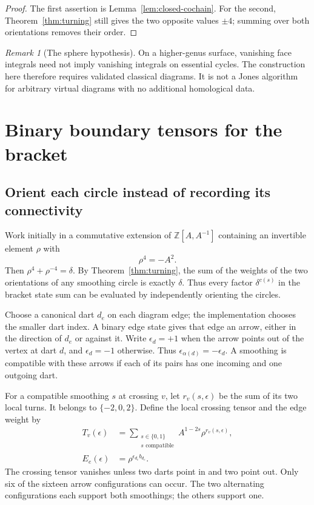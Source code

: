 \documentclass[11pt]{article}
\theoremstyle{definition}
\theoremstyle{remark}
\newtheorem{remark}[theorem]{Remark}
\newcommand{\Z}{\mathbb Z}
\begin{document}
\begin{proof}
The first assertion is Lemma~\ref{lem:closed-cochain}. For the second,
Theorem~\ref{thm:turning} still gives the two opposite values $\pm4$;
summing over both orientations removes their order.
\end{proof}

\begin{remark}[The sphere hypothesis]
On a higher-genus surface, vanishing face integrals need not imply
vanishing integrals on essential cycles. The construction here therefore
requires validated classical diagrams. It is not a Jones algorithm for
arbitrary virtual diagrams with no additional homological data.
\end{remark}

\section{Binary boundary tensors for the bracket}
\label{sec:tensors}

\subsection{Orient each circle instead of recording its connectivity}

Work initially in a commutative extension of
$\Z[A,A^{-1}]$ containing an invertible element $\rho$ with
\begin{equation}\label{eq:rho-fourth}
 \rho^4=-A^2.
\end{equation}
Then $\rho^4+\rho^{-4}=\delta$. By Theorem~\ref{thm:turning}, the sum of the
weights of the two orientations of any smoothing circle is exactly
$\delta$. Thus every factor $\delta^{c(s)}$ in the bracket state sum can
be evaluated by independently orienting the circles.

Choose a canonical dart $d_e$ on each diagram edge; the implementation
chooses the smaller dart index. A binary edge state gives that edge an
arrow, either in the direction of $d_e$ or against it. Write
$\epsilon_d=+1$ when the arrow points out of the vertex at dart $d$, and
$\epsilon_d=-1$ otherwise. Thus $\epsilon_{\alpha(d)}=-\epsilon_d$.
A smoothing is compatible with these arrows if each of its pairs has one
incoming and one outgoing dart.

For a compatible smoothing $s$ at crossing $v$, let $r_v(s,\epsilon)$ be
the sum of its two local turns. It belongs to $\{-2,0,2\}$. Define the
local crossing tensor and the edge weight by
\begin{align}
 T_v(\epsilon)&=\sum_{\substack{s\in\{0,1\}\\s\text{ compatible}}}
          A^{1-2s}\rho^{r_v(s,\epsilon)},\label{eq:crossing-tensor}\\
 E_e(\epsilon)&=\rho^{\epsilon_{d_e}b_{d_e}}.\label{eq:edge-tensor}
\end{align}
The crossing tensor vanishes unless two darts point in and two point out.
Only six of the sixteen arrow configurations can occur. The two alternating
configurations each support both smoothings; the others support one.
\end{document}
